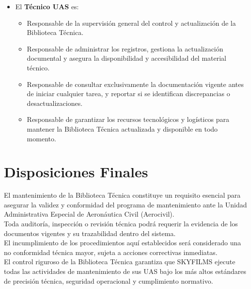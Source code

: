 \begin{itemize}
    \item El \textbf{Técnico UAS} es:
        \begin{itemize}
            \item Responsable de la supervisión general del control y actualización de la Biblioteca Técnica.
            
            \item Responsable de administrar los registros, gestiona la actualización documental y asegura la disponibilidad y accesibilidad del material técnico.

           \item Responsable de consultar exclusivamente la documentación vigente antes de iniciar cualquier tarea, y reportar si se identifican discrepancias o desactualizaciones.

            \item Responsable de garantizar los recursos tecnológicos y logísticos para mantener la Biblioteca Técnica actualizada y disponible en todo momento.
        \end{itemize}
    
\end{itemize}

\section{Disposiciones Finales}
El mantenimiento de la Biblioteca Técnica constituye un requisito esencial para asegurar la validez y conformidad del programa de mantenimiento ante la Unidad Administrativa Especial de Aeronáutica Civil (Aerocivil).\\

Toda auditoría, inspección o revisión técnica podrá requerir la evidencia de los documentos vigentes y su trazabilidad dentro del sistema.\\

El incumplimiento de los procedimientos aquí establecidos será considerado una no conformidad técnica mayor, sujeta a acciones correctivas inmediatas.\\

El control riguroso de la Biblioteca Técnica garantiza que SKYFILMS ejecute todas las actividades de mantenimiento de sus UAS bajo los más altos estándares de precisión técnica, seguridad operacional y cumplimiento normativo.